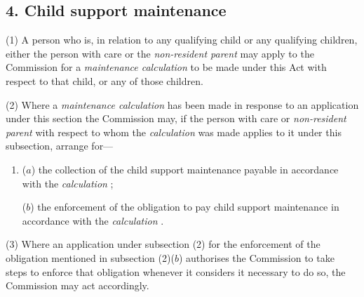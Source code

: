 \documentclass[12pt,a4paper]{article}
\begin{document}
\subsection{4. Child support maintenance}

(1) A person who is, in relation to any qualifying child or any qualifying children, either the person with care or the 
\emph{non-resident parent}  %
may apply to the 
Commission  %
for a 
\emph{maintenance calculation}  %
to be made under this Act with respect to that child, or any of those children.

(2) Where a 
\emph{maintenance calculation}  %
has been made in response to an application under this section the 
Commission  %
may, if the person with care or 
\emph{non-resident parent}  %
with respect to whom the 
\emph{calculation}  %
was made applies to 
it  %
under this subsection, arrange for—
\begin{enumerate}\item[]
($a$) the collection of the child support maintenance payable in accordance with the 
\emph{calculation}%
;

($b$) the enforcement of the obligation to pay child support maintenance in accordance with the 
\emph{calculation}%
.
\end{enumerate}

(3) Where an application under subsection (2)  for the enforcement of the obligation mentioned in subsection (2)($b$)  authorises the 
Commission  %
to take steps to enforce that obligation whenever 
it  %
considers it necessary to do so, the 
Commission  %
may act accordingly.
\end{document}
